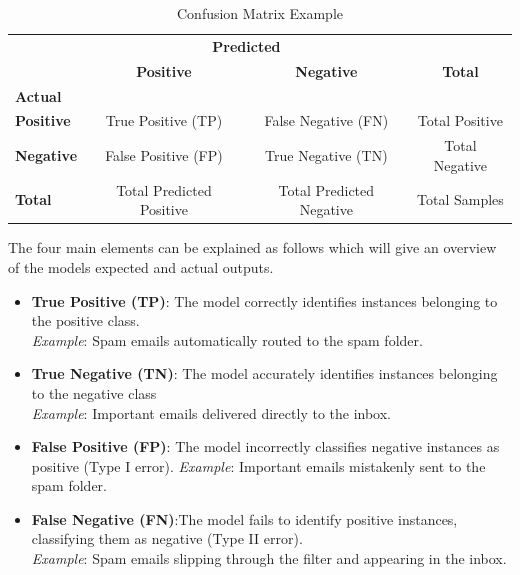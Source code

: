 \begin{table}[ht]
    \centering
    \begin{tabular}{l|c|c|c}
      \toprule
      & \multicolumn{2}{c}{\textbf{Predicted}} & \\
      \cmidrule(lr){2-3}
      & \textbf{Positive} & \textbf{Negative} & \textbf{Total} \\
      \midrule
      \textbf{Actual} \tabularnewline
      \textbf{Positive} & True Positive (TP) & False Negative (FN) & Total Positive \\
      \midrule
      \textbf{Negative} & False Positive (FP) & True Negative (TN) & Total Negative \\
      \midrule
      \textbf{Total} & Total Predicted Positive & Total Predicted Negative & Total Samples \\
      \bottomrule
    \end{tabular}
    \caption{Confusion Matrix Example}
    \label{tab:confusion_matrix}
  \end{table}

  The four main elements can be explained as follows which will give an overview of the models expected and actual outputs.
  \begin{itemize}
    \item \textbf{True Positive (TP)}:  The model correctly identifies instances belonging to the positive class. \\
      \textit{Example}: Spam emails automatically routed to the spam folder.

      \item \textbf{True Negative (TN)}: The model accurately identifies instances belonging to the negative class \\
      \textit{Example}: Important emails delivered directly to the inbox.
  
        \item \textbf{False Positive (FP)}: The model incorrectly classifies negative instances as positive (Type I error).
      \textit{Example}: Important emails mistakenly sent to the spam folder.
  
    \item \textbf{False Negative (FN)}:The model fails to identify positive instances, classifying them as negative (Type II error). \\
      \textit{Example}: Spam emails slipping through the filter and appearing in the inbox.
  
  \end{itemize}

